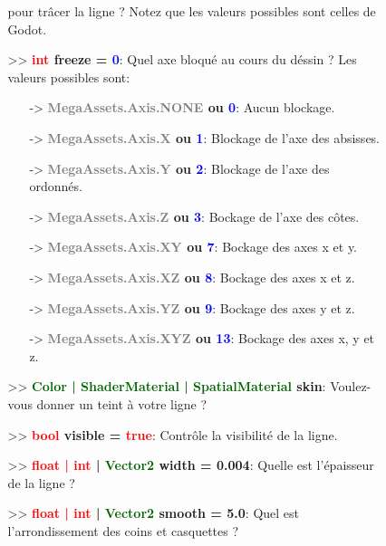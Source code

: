 \documentclass[a4paper, 11pt]{article}
\begin{document}
\begin{description}
\begin{itemize}
\begin{itemize}
				pour trâcer la ligne ? Notez que les valeurs possibles sont celles de Godot.\\
				\item[>> \textbf{\textcolor{red}{int} freeze = \textcolor{blue}{0}}:] Quel axe bloqué au
				cours du déssin ? Les valeurs possibles sont:
				\begin{itemize}
					\item [-> \textbf{\textcolor{gray}{MegaAssets.Axis.NONE} ou \textcolor{blue}{0}}:] Aucun 
					blockage.
					\item [-> \textbf{\textcolor{gray}{MegaAssets.Axis.X} ou \textcolor{blue}{1}}:] Blockage 
					de l'axe des absisses.
					\item [-> \textbf{\textcolor{gray}{MegaAssets.Axis.Y} ou \textcolor{blue}{2}}:] Blockage 
					de l'axe des ordonnés.
					\item [-> \textbf{\textcolor{gray}{MegaAssets.Axis.Z} ou \textcolor{blue}{3}}:] Bockage 
					de l'axe des côtes.
					\item [-> \textbf{\textcolor{gray}{MegaAssets.Axis.XY} ou \textcolor{blue}{7}}:] Bockage 
					des axes x et y.
					\item [-> \textbf{\textcolor{gray}{MegaAssets.Axis.XZ} ou \textcolor{blue}{8}}:] Bockage 
					des axes x et z.
					\item [-> \textbf{\textcolor{gray}{MegaAssets.Axis.YZ} ou \textcolor{blue}{9}}:] Bockage 
					des axes y et z.
					\item [-> \textbf{\textcolor{gray}{MegaAssets.Axis.XYZ} ou \textcolor{blue}{13}}:]
					Bockage des axes x, y et z.\\
				\end{itemize}
				\item[>> \textbf{\textcolor{darkgreen}{Color | ShaderMaterial | SpatialMaterial} skin}:]
				Voulez-vous donner un teint à votre ligne ?\\
				\item[>> \textbf{\textcolor{red}{bool} visible = \textcolor{red}{true}}:] Contrôle la
				visibilité de la ligne.\\
				\item[>> \textbf{\textcolor{red}{float | int} | \textcolor{darkgreen}{Vector2} width = 
				0.004}:] Quelle est l'épaisseur de la ligne ?\\
				\item[>> \textbf{\textcolor{red}{float | int} | \textcolor{darkgreen}{Vector2} smooth = 
				5.0}:] Quel est l'arrondissement des coins et casquettes ?\\

\end{itemize}
\end{itemize}
\end{description}
\end{document}
